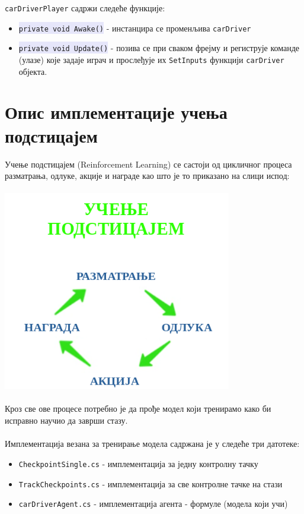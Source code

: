 \documentclass[12pt]{article}
\newcommand{\mycode}[1]{\texttt{\colorbox{Lavender}{#1}}}
\begin{document}
\vspace{0.5cm}
 \texttt{carDriverPlayer} садржи следеће функције: 
\begin{itemize}
  \item \mycode{private void Awake()} - инстанцира се променљива \texttt{carDriver}
  \item \mycode{private void Update()} - позива се при сваком фрејму и региструје команде (улазе) које задаје играч и прослеђује их \texttt{SetInputs} функцији \texttt{carDriver} објекта.
\end{itemize}

\newpage
\section{Опис имплементације учења подстицајем}
Учење подстицајем (Reinforcement Learning) се састоји од цикличног процеса разматрања, одлуке, акције и награде као што је то приказано на слици испод:
\begin{center}
    \centering 
    \includegraphics[height=9cm, width=10cm]{images/RL-cycle.png}
\end{center}
\vspace{0.5cm}
Кроз све ове процесе потребно је да прође модел који тренирамо како би исправно научио да заврши стазу.\\\\
Имплементација везана за тренирање модела садржана је у следеће три датотеке:
\begin{itemize}
  \item \texttt{CheckpointSingle.cs} - имплементација за једну контролну тачку
  \item \texttt{TrackCheckpoints.cs} - имплементација за све контролне тачке на стази
  \item \texttt{carDriverAgent.cs} - имплементација агента - формуле (модела који учи)
\end{itemize}
\end{document}
